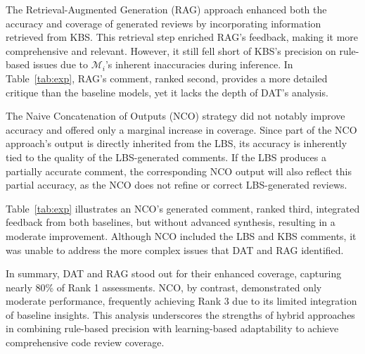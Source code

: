 The Retrieval-Augmented Generation (RAG) approach enhanced both the accuracy and coverage of generated reviews by incorporating information retrieved from KBS. This retrieval step enriched RAG's feedback, making it more comprehensive and relevant. However, it still fell short of KBS’s precision on rule-based issues due to \(\mathcal{M}_i\)’s inherent inaccuracies during inference. In Table~\ref{tab:exp}, RAG’s comment, ranked second, provides a more detailed critique than the baseline models, yet it lacks the depth of DAT’s analysis.

The Naive Concatenation of Outputs (NCO) strategy did not notably improve accuracy and offered only a marginal increase in coverage. Since part of the NCO approach’s output is directly inherited from the LBS, its accuracy is inherently tied to the quality of the LBS-generated comments. If the LBS produces a partially accurate comment, the corresponding NCO output will also reflect this partial accuracy, as the NCO does not refine or correct LBS-generated reviews.

Table~\ref{tab:exp} illustrates an NCO’s generated comment, ranked third, integrated feedback from both baselines, but without advanced synthesis, resulting in a moderate improvement. Although NCO included the LBS and KBS comments, it was unable to address the more complex issues that DAT and RAG identified.

In summary, DAT and RAG stood out for their enhanced coverage, capturing nearly 80\% of Rank 1 assessments. NCO, by contrast, demonstrated only moderate performance, frequently achieving Rank 3 due to its limited integration of baseline insights. This analysis underscores the strengths of hybrid approaches in combining rule-based precision with learning-based adaptability to achieve comprehensive code review coverage.





